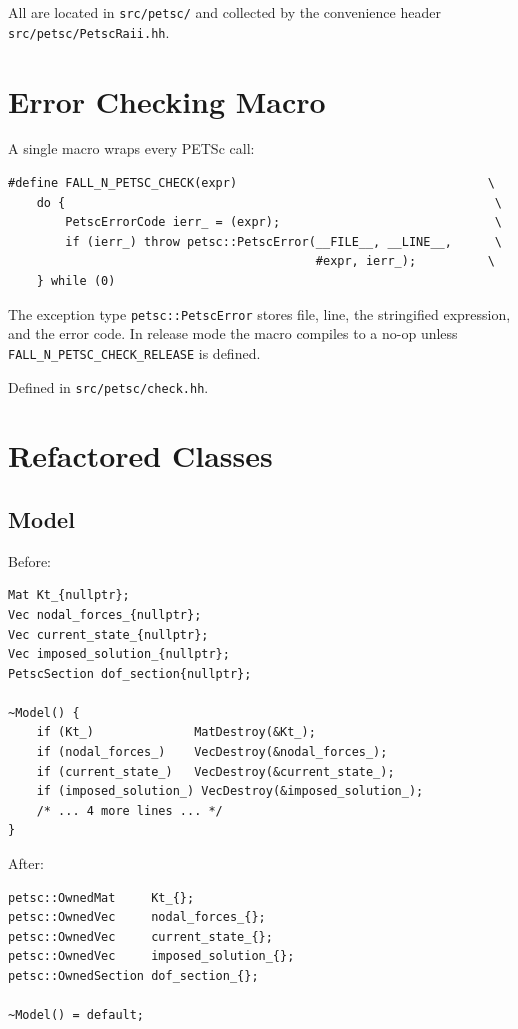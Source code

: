 All are located in \texttt{src/petsc/} and collected by the convenience
header \texttt{src/petsc/PetscRaii.hh}.

\section{Error Checking Macro}
\label{sec:phase0-check}

A single macro wraps every PETSc call:

\begin{verbatim}
#define FALL_N_PETSC_CHECK(expr)                                   \
    do {                                                            \
        PetscErrorCode ierr_ = (expr);                              \
        if (ierr_) throw petsc::PetscError(__FILE__, __LINE__,      \
                                           #expr, ierr_);          \
    } while (0)
\end{verbatim}

The exception type \texttt{petsc::PetscError} stores file, line, the
stringified expression, and the error code.  In release mode the macro
compiles to a no-op unless \texttt{FALL\_N\_PETSC\_CHECK\_RELEASE} is defined.

Defined in \texttt{src/petsc/check.hh}.

\section{Refactored Classes}
\label{sec:phase0-refactored}

\subsection{Model}

Before:
\begin{verbatim}
Mat Kt_{nullptr};
Vec nodal_forces_{nullptr};
Vec current_state_{nullptr};
Vec imposed_solution_{nullptr};
PetscSection dof_section{nullptr};

~Model() {
    if (Kt_)              MatDestroy(&Kt_);
    if (nodal_forces_)    VecDestroy(&nodal_forces_);
    if (current_state_)   VecDestroy(&current_state_);
    if (imposed_solution_) VecDestroy(&imposed_solution_);
    /* ... 4 more lines ... */
}
\end{verbatim}

After:
\begin{verbatim}
petsc::OwnedMat     Kt_{};
petsc::OwnedVec     nodal_forces_{};
petsc::OwnedVec     current_state_{};
petsc::OwnedVec     imposed_solution_{};
petsc::OwnedSection dof_section_{};

~Model() = default;
\end{verbatim}

